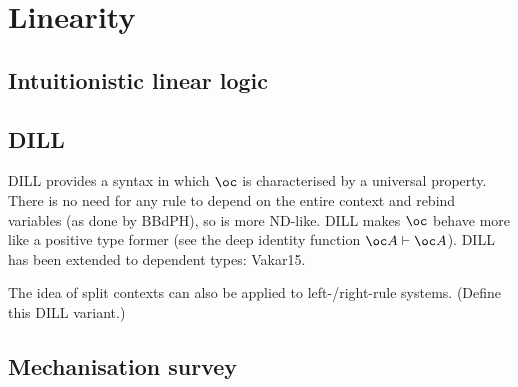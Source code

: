 \chapter{Linearity}\label{sec:linearity}

\section{Intuitionistic linear logic}

\section{DILL}
DILL provides a syntax in which $\oc$ is characterised by a universal
property.
There is no need for any rule to depend on the entire context and rebind
variables (as done by BBdPH), so is more ND-like.
DILL makes $\oc$ behave more like a positive type former (see the deep
identity function $\oc A \vdash \oc A$).
DILL has been extended to dependent types: Vakar15.

The idea of split contexts can also be applied to left-/right-rule systems.
(Define this DILL variant.)

\section{Mechanisation survey}
